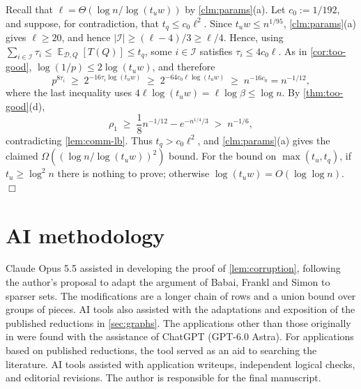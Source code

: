 \documentclass[11pt]{article}
\theoremstyle{plain}
\theoremstyle{definition}
\theoremstyle{remark}
\newcommand{\E}{\mathop{\mathbb{E}}}
\newcommand{\abs}[1]{\left|#1\right|}
\newcommand{\cI}{\mathcal{I}}
\newcommand{\cD}{\mathcal{D}}
\newenvironment{proofof}[1]{\smallskip\noindent{\bf Proof of #1.}}%
{\hspace*{\fill}$\Box$\par}
\begin{document}
\begin{proofof}{\cref{thm:main}}
Recall that $\ell = \Theta(\log n/\log(t_u w))$ by \cref{clm:params}(a). Let $c_0:=1/192$, and suppose, for contradiction, that $t_q \le c_0\ell^2$. Since $t_u w \le n^{1/95}$, \cref{clm:params}(a) gives $\ell\ge20$, and hence $\abs{\cI}\ge(\ell-4)/3\ge\ell/4$. Hence, using $\sum_{i \in \cI}\tau_i\le \E_{\cD,Q}[T(Q)]\le t_q$, some $i\in\cI$ satisfies $\tau_i\le4c_0\ell$. As in \cref{cor:too-good}, $\log(1/p)\le2\log(t_u w)$, and therefore
\[
 p^{8\tau_i} \;\ge\; 2^{-16\tau_i\log(t_u w)}
 \;\ge\; 2^{-64c_0\ell\log(t_u w)}
 \;\ge\; n^{-16c_0}=n^{-1/12},
\]
where the last inequality uses $4\ell\log(t_u w)=\ell\log\beta\le\log n$. By \cref{thm:too-good}(d),
\[
\rho_1 \;\ge\; \frac18 n^{-1/12}-e^{-n^{1/4}/3} \;>\; n^{-1/6},
\]
contradicting \cref{lem:comm-lb}. Thus $t_q>c_0\ell^2$, and \cref{clm:params}(a) gives the claimed $\Omega((\log n/\log(t_u w))^2)$ bound. For the bound on $\max(t_u,t_q)$, if $t_u\ge\log^2 n$ there is nothing to prove; otherwise $\log(t_u w)=O(\log\log n)$.
\end{proofof}



\section*{AI methodology}
Claude Opus 5.5 assisted in developing the proof of \cref{lem:corruption}, following the author's proposal to adapt the argument of Babai, Frankl and Simon \cite{babai_complexity_1986} to sparser sets. The modifications are a longer chain of rows and a union bound over groups of pieces. AI tools also assisted with the adaptations and exposition of the published reductions in \cref{sec:graphs}. The applications other than those originally in \cite{patrascu_mihai_towards_2010} were found with the assistance of ChatGPT (GPT-6.0 Astra). For applications based on published reductions, the tool served as an aid to searching the literature. AI tools assisted with application writeups, independent logical checks, and editorial revisions. The author is responsible for the final manuscript.




\clearpage

\end{document}
